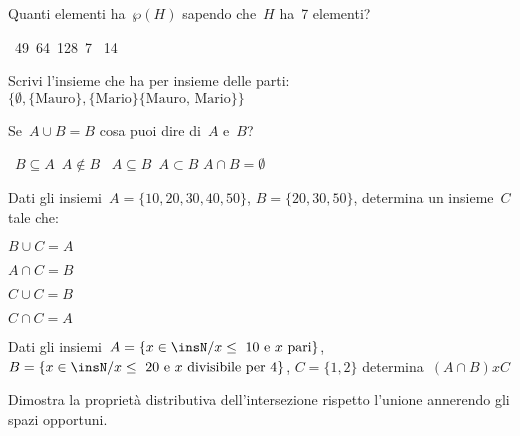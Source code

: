 \begin{esercizio}
\label{ese:7.73}
Quanti elementi ha~$\wp (H)$ sapendo che~$H$ ha~7 elementi?
\begin{center}
 
\boxA\quad~49\quad\boxB\quad~64\quad\boxC\quad~128\quad\boxD\quad~7\quad
\boxE\quad~14
\end{center}
\end{esercizio}

\begin{esercizio}
\label{ese:7.74}
Scrivi l'insieme che ha per insieme delle parti:
$\{\emptyset,\{\text{Mauro}\},\{\text{Mario}\}\{\text{Mauro, Mario}\}\}$
\end{esercizio}

\begin{esercizio}
\label{ese:7.75}
Se~$A\cup B=B$ cosa puoi dire di~$A$ e~$B$?
\begin{center}
 \boxA\quad~$B\subseteq A$\quad\boxB\quad~$A\notin B$\quad
 \boxC\quad~$A\subseteq B$\quad\boxD\quad~$A\subset B$\quad
 \boxE\quad$A\cap B=\emptyset $
\end{center}
\end{esercizio}

\begin{esercizio}
\label{ese:7.76}
Dati gli insiemi~$A=\{10, 20, 30, 40, 50\}$, $B=\{20, 30, 50\}$,
determina un insieme~$C$ tale che:
\begin{multicols}{4}
\begin{enumeratea}
 \item $B\cup C=A$
 \item $A\cap C=B$
 \item $C\cup C=B$
 \item $C\cap C=A$
\end{enumeratea}
\end{multicols}
\end{esercizio}

\begin{esercizio}
\label{ese:7.77}
Dati gli insiemi~$A=\{x\in\insN/x\le~10\text{ e }x\text{ pari}\}$,
$B=\{x\in\insN/x\le~20\text{ e }x\text{ divisibile per }4\}$,
$C=\{1,2\}$ determina~$(A\cap B)xC$
\end{esercizio}

\begin{esercizio}
\label{ese:7.78}
Dimostra la proprietà distributiva dell'intersezione rispetto l'unione annerendo 
gli spazi opportuni.
\begin{center}
 
\end{center}
\vspace{-12pt}
\end{esercizio}

